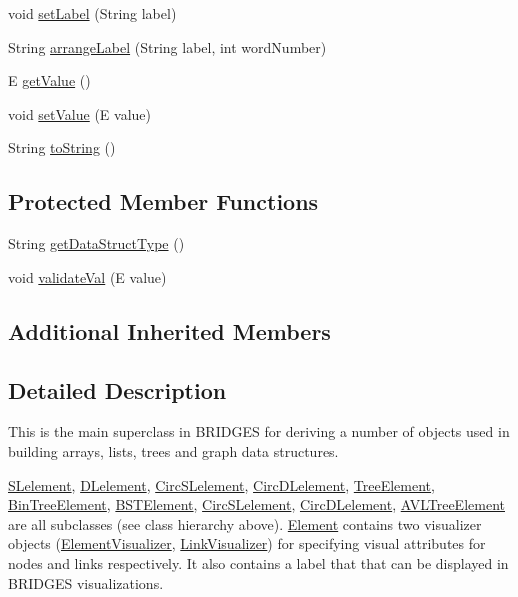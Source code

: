 \begin{DoxyCompactItemize}
\item 
void \hyperlink{classbridges_1_1base_1_1_element_a942ccd766aeca0c4fdbe27ef8cbe78d9}{set\+Label} (String label)
\item 
String \hyperlink{classbridges_1_1base_1_1_element_acd2191242df8a7bf2e8b6ced87880ba6}{arrange\+Label} (String label, int word\+Number)
\item 
E \hyperlink{classbridges_1_1base_1_1_element_a44ddc61db34b6cf0bab7dfba667d54af}{get\+Value} ()
\item 
void \hyperlink{classbridges_1_1base_1_1_element_ab3cf1241da0bc4c59cea9d6f0fd7aaf4}{set\+Value} (E value)
\item 
String \hyperlink{classbridges_1_1base_1_1_element_a7dc685e317fd9dc2e73e049a9f907e42}{to\+String} ()
\end{DoxyCompactItemize}
\subsection*{Protected Member Functions}
\begin{DoxyCompactItemize}
\item 
String \hyperlink{classbridges_1_1base_1_1_element_a6a1b70fa4b1936d10c6deb433acf8cd9}{get\+Data\+Struct\+Type} ()
\item 
void \hyperlink{classbridges_1_1base_1_1_element_af1a60f4e6a91d379179f7d56e6dc3829}{validate\+Val} (E value)
\end{DoxyCompactItemize}
\subsection*{Additional Inherited Members}


\subsection{Detailed Description}
This is the main superclass in B\+R\+I\+D\+G\+ES for deriving a number of objects used in building arrays, lists, trees and graph data structures. 

\hyperlink{classbridges_1_1base_1_1_s_lelement}{S\+Lelement}, \hyperlink{classbridges_1_1base_1_1_d_lelement}{D\+Lelement}, \hyperlink{classbridges_1_1base_1_1_circ_s_lelement}{Circ\+S\+Lelement}, \hyperlink{classbridges_1_1base_1_1_circ_d_lelement}{Circ\+D\+Lelement}, \hyperlink{classbridges_1_1base_1_1_tree_element}{Tree\+Element}, \hyperlink{classbridges_1_1base_1_1_bin_tree_element}{Bin\+Tree\+Element}, \hyperlink{classbridges_1_1base_1_1_b_s_t_element}{B\+S\+T\+Element}, \hyperlink{classbridges_1_1base_1_1_circ_s_lelement}{Circ\+S\+Lelement}, \hyperlink{classbridges_1_1base_1_1_circ_d_lelement}{Circ\+D\+Lelement}, \hyperlink{classbridges_1_1base_1_1_a_v_l_tree_element}{A\+V\+L\+Tree\+Element} are all subclasses (see class hierarchy above). \hyperlink{classbridges_1_1base_1_1_element}{Element} contains two visualizer objects (\hyperlink{classbridges_1_1base_1_1_element_visualizer}{Element\+Visualizer}, \hyperlink{classbridges_1_1base_1_1_link_visualizer}{Link\+Visualizer}) for specifying visual attributes for nodes and links respectively. It also contains a label that that can be displayed in B\+R\+I\+D\+G\+ES visualizations.

